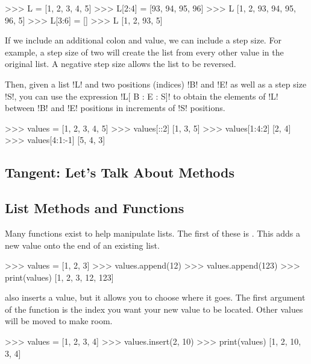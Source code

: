 \documentclass[11pt]{cselabheader}
\begin{document}
\begin{pyconcode}
>>> L = [1, 2, 3, 4, 5]
>>> L[2:4] = [93, 94, 95, 96]
>>> L
[1, 2, 93, 94, 95, 96, 5]
>>> L[3:6] = []
>>> L
[1, 2, 93, 5]
\end{pyconcode}

If we include an additional colon and value, we can include a step size. For
example, a step size of two will create the list from every other value in the
original list. A negative step size allows the list to be reversed.

Then, given a list \pythoninline!L! and two positions (indices) \pythoninline!B! and
\pythoninline!E! as well as a step size \pythoninline!S!, you can use the expression
\pythoninline!L[ B : E : S]! to obtain the elements of \pythoninline!L! between
\pythoninline!B! and \pythoninline!E! positions in increments of \pythoninline!S!
positions.

\begin{pyconcode}
>>> values = [1, 2, 3, 4, 5]
>>> values[::2]
[1, 3, 5]
>>> values[1:4:2]
[2, 4]
>>> values[4:1:-1]
[5, 4, 3]
\end{pyconcode}

\subsection{Tangent: Let's Talk About Methods}


\subsection{List Methods and Functions}
Many functions exist to help manipulate lists. The first of these is
. This adds a new value onto the end of an existing list.

\begin{pyconcode}
>>> values = [1, 2, 3]
>>> values.append(12)
>>> values.append(123)
>>> print(values)
[1, 2, 3, 12, 123]
\end{pyconcode}

 also inserts a value, but it allows you to choose where it
goes. The first argument of the function is the index you want your new value to
be located. Other values will be moved to make room.

\begin{pyconcode}
>>> values = [1, 2, 3, 4]
>>> values.insert(2, 10)
>>> print(values)
[1, 2, 10, 3, 4]
\end{pyconcode}
\end{document}
